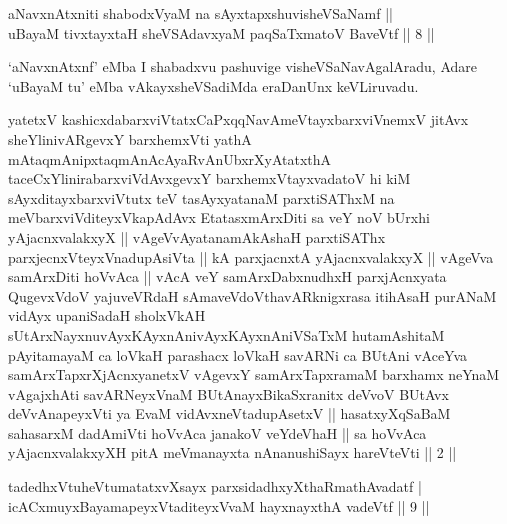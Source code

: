 
\begin{shl}
aNavxnAtxniti shabodxV\s yaM na sAyxtapxshuvisheVSaNamf || \\
uBayaM tivxtayxtaH sheVSAdavxyaM paqSaTxmatoV BaveVtf \hfill ||  8 ||  
\end{shl}

\begin{artha}
`aNavxnAtxnf' eMba I shabadxvu pashuvige visheVSaNavAgalAradu, Adare `uBayaM tu' eMba vAkayxsheVSadiMda eraDanUnx keVLiruvadu.
\end{artha}


\begin{kandikeshl}
yatetxV kashicxdabarxviVtatxCaPxqqNavAmeVtayxbarxviVnemxV jitAvx sheYlinivARgevxY barxhemxVti yathA mAtaqmAnipxtaqmAnAcAyaRvAnUbxrXyAtatxthA taceCxYlinirabarxviVdAvxgevxY barxhemxVtayxvadatoV hi kiM sAyxditayxbarxviVtutx teV tasAyxyatanaM parxtiSAThxM na meV\s barxviVditeyxVkapAdAvx EtatasxmArxDiti sa veY noV bUrxhi yAjacnxvalakxyX || vAgeVvAyatanamAkAshaH parxtiSAThx parxjecnxVteyxVnadupAsiVta || kA parxjacnxtA yAjacnxvalakxyX || vAgeVva samArxDiti hoVvAca || vAcA veY samArxDabxnudhxH parxjAcnxyata QugevxVdoV yajuveVRdaH sAmaveVdoV\s thavARknigxrasa itihAsaH purANaM vidAyx upaniSadaH sholxVkAH sUtArxNayxnuvAyxKAyxnAni\break vAyxKAyxnAniVSaTxM hutamAshitaM pAyitamayaM ca loVkaH parashacx loVkaH savARNi ca BUtAni vAceYva samArxTapxrXjAcnxyanetxV vAgevxY samArxTapxramaM barxhamx neYnaM vAgajxhAti savARNeyxVnaM BUtAnayxBikaSxranitx deVvoV BUtAvx deVvAnapeyxVti ya EvaM vidAvxneVtadupAsetxV || hasatxyXqSaBaM sahasarxM dadAmiVti hoVvAca janakoV veYdeVhaH || sa hoVvAca yAjacnxvalakxyXH pitA meV\s manayxta nAnanushiSayx hareVteVti || 2 ||
\end{kandikeshl}




\begin{shl}
tadedhxVtuheVtumatatxvXsayx parxsidadhxyXthaRmathAvadatf |\\
icACxmuyxBayamapeyxVtaditeyxVvaM hayxnayxthA vadeVtf \hfill || 9 || 
\end{shl}
\vskip 2cm



